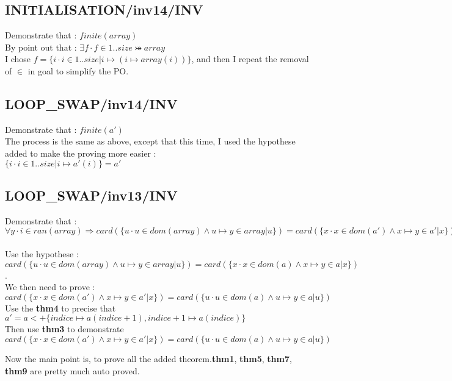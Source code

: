 \subsection{INITIALISATION/inv14/INV}
Demonstrate that : $finite(array)$ \\
By point out that : $\exists f \cdot f \in 1..size \bij array$ \\
I chose $f = \{i \cdot i\in 1..size | i \mapsto (i \mapsto array(i)) \}$, and then I repeat the removal of $\in$ in goal to simplify the PO.

\subsection{LOOP\_SWAP/inv14/INV}
Demonstrate that : $finite(a')$ \\
The process is the same as above, except that this time, I used the hypothese added to make the proving more easier : \\
$\{i \cdot i \in 1..size | i \mapsto a'(i)\} = a'$

\subsection{LOOP\_SWAP/inv13/INV}
Demonstrate that : \\
$\forall y \cdot i \in ran(array) \Rightarrow card(\{u \cdot u \in dom(array) \land u \mapsto y \in array | u\}) = card(\{x \cdot x \in dom(a') \land x \mapsto y \in a' | x\})$ \\

\paragraph{}
Use the hypothese : $card(\{u \cdot u \in dom(array) \land u \mapsto y \in array | u\}) = card(\{x \cdot x \in dom(a) \land x \mapsto y \in a | x\}) $. \\
We then need to prove : \\
$card(\{x \cdot x \in dom(a') \land x \mapsto y \in a' | x\}) = card(\{u \cdot u \in dom(a) \land u \mapsto y \in a | u\})$\\
Use the \textbf{thm4} to precise that $a' = a <+ \{indice \mapsto a(indice+1), indice+1 \mapsto a(indice) \}$ \\
Then use \textbf{thm3} to demonstrate $card(\{x \cdot x \in dom(a') \land x \mapsto y \in a' | x\}) = card(\{u \cdot u \in dom(a) \land u \mapsto y \in a | u\})$

Now the main point is, to prove all the added theorem.\textbf{thm1}, \textbf{thm5}, \textbf{thm7}, \textbf{thm9} are pretty much auto proved.

